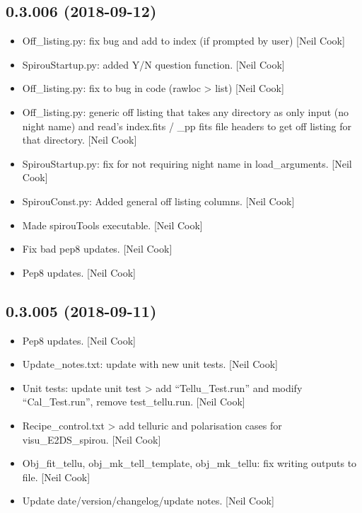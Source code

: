 \documentclass[a4paper,10pt,english]{report}
\begin{document}
\subsection{0.3.006 (2018-09-12)}
\label{\detokenize{misc/changelog:id326}}\begin{itemize}
\item {} 
Off\_listing.py: fix bug and add to index (if prompted by user) {[}Neil
Cook{]}

\item {} 
SpirouStartup.py: added Y/N question function. {[}Neil Cook{]}

\item {} 
Off\_listing.py: fix to bug in code (rawloc \textendash{}\textgreater{} list) {[}Neil Cook{]}

\item {} 
Off\_listing.py: generic off listing that takes any directory as only
input (no night name) and read’s index.fits / \_pp fits file headers to
get off listing for that directory. {[}Neil Cook{]}

\item {} 
SpirouStartup.py: fix for not requiring night name in load\_arguments.
{[}Neil Cook{]}

\item {} 
SpirouConst.py: Added general off listing columns. {[}Neil Cook{]}

\item {} 
Made spirouTools executable. {[}Neil Cook{]}

\item {} 
Fix bad pep8 updates. {[}Neil Cook{]}

\item {} 
Pep8 updates. {[}Neil Cook{]}

\end{itemize}


\subsection{0.3.005 (2018-09-11)}
\label{\detokenize{misc/changelog:id327}}\begin{itemize}
\item {} 
Pep8 updates. {[}Neil Cook{]}

\item {} 
Update\_notes.txt: update with new unit tests. {[}Neil Cook{]}

\item {} 
Unit tests: update unit test \textendash{}\textgreater{} add “Tellu\_Test.run” and modify
“Cal\_Test.run”, remove test\_tellu.run. {[}Neil Cook{]}

\item {} 
Recipe\_control.txt \textendash{}\textgreater{} add telluric and polarisation cases for
visu\_E2DS\_spirou. {[}Neil Cook{]}

\item {} 
Obj\_fit\_tellu, obj\_mk\_tell\_template, obj\_mk\_tellu: fix writing outputs
to file. {[}Neil Cook{]}

\item {} 
Update date/version/changelog/update notes. {[}Neil Cook{]}

\end{itemize}
\end{document}
